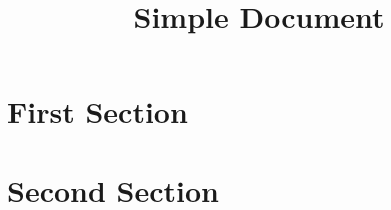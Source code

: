 \documentclass[11pt]{article}
\title{Simple Document}
\author{}
\date{}
\begin{document}
\raggedright
\maketitle

\section*{First Section}
\lipsum[1-2]

\section*{Second Section}
\lipsum[3-5]
\end{document}
